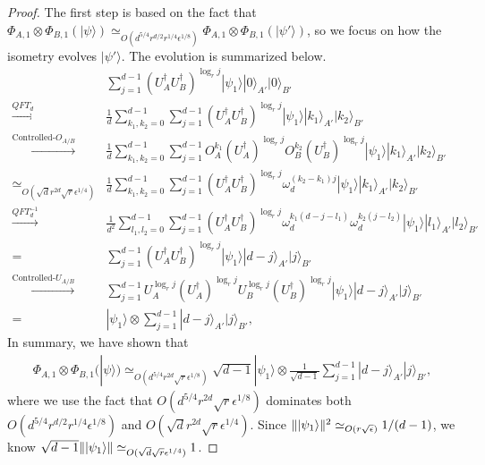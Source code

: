 \documentclass[11pt,letterpaper]{article}
\newcommand{\ket}[1]{|#1\rangle}
\newcommand{\x}{\otimes}
\newcommand{\ct}{^{\dagger}}
\DeclarePairedDelimiter{\norm}{\lVert}{\rVert}
\newcommand{\1}{\mathbb{1}}
\newcommand{\ep}{\epsilon}
\newcommand{\se}{\sqrt{\epsilon}}
\newcommand{\qe}{\epsilon^{1/4}}
\newcommand{\sd}{\sqrt{d}}
\newcommand{\sr}{\sqrt{r}}
\newcommand{\appd}[1]{\simeq_{#1}}
\theoremstyle{definition}
\begin{document}
\begin{proof}
The first step is based on the fact that $ \Phi_{A,1} \x \Phi_{B,1} (\ket{\psi}) \appd{O(d^{5/4} r^{d/2} r^{1/4} \ep^{1/8})}  \Phi_{A,1} \x \Phi_{B,1} (\ket{\psi'})$,  
so we focus on how the isometry evolves $\ket{\psi'}$.
The evolution is summarized below.
	\begin{align}
		& \sum_{j=1}^{d-1} (U_A\ct U_B\ct)^{\log_r j} \ket{\psi_1} \ket{0}_{A'}\ket{0}_{B'}\\
		\xrightarrow[]{QFT_d}& \frac{1}{d}\sum_{k_1,k_2 = 0}^{d-1} \sum_{j=1}^{d-1} (U_A\ct U_B\ct)^{\log_r j}  \ket{\psi_1}\ket{k_1}_{A'}\ket{k_2}_{B'}\\
		\xrightarrow[]{\text{Controlled-}O_{A/B}}& \frac{1}{d}\sum_{k_1,k_2 = 0}^{d-1} \sum_{j=1}^{d-1} O_A^{k_1}(U_A\ct)^{\log_r j} O_B^{k_2}(U_B\ct)^{\log_r j}
		\ket{\psi_1} \ket{k_1}_{A'}\ket{k_2}_{B'}\\
		\appd{O(\sd r^{2d} \sr \qe)}&\frac{1}{d} \sum_{k_1,k_2 = 0}^{d-1} \sum_{j=1}^{d-1} (U_A\ct U_B\ct)^{\log_r j}\omega_d^{(k_2-k_1)j}\ket{\psi_1} \ket{k_1}_{A'}\ket{k_2}_{B'}\\
		\xrightarrow[]{QFT_d^{-1}} &\frac{1}{d^2}\sum_{l_1,l_2 = 0}^{d-1}\sum_{j=1}^{d-1} (U_A\ct U_B\ct)^{\log_r j} 
		\omega_d^{k_1(d-j-l_1)}\omega_d^{k_2(j-l_2)}\ket{\psi_1} \ket{l_1}_{A'}\ket{l_2}_{B'}\\
		= &\sum_{j=1}^{d-1}(U_A\ct U_B\ct)^{\log_r j} \ket{\psi_1} \ket{d-j}_{A'}\ket{j}_{B'} \\
		\xrightarrow[]{\text{Controlled-}U_{A/B}}& \sum_{j=1}^{d-1} U_A^{\log_r j} (U_A\ct)^{\log_r j} U_B^{\log_r j} (U_B\ct)^{\log_r j} \ket{\psi_1} \ket{d-j}_{A'}\ket{j}_{B'}\\
		=&\ket{\psi_1} \x \sum_{j=1}^{d-1} \ket{d-j}_{A'}\ket{j}_{B'},
	\end{align}
In summary, we have shown that
\begin{align}
	\Phi_{A,1}\x\Phi_{B,1}(\ket{\psi}) \appd{O(d^{5/4} r^{2d} \sr \ep^{1/8})} \sqrt{d-1} \ket{\psi_1} \x \frac{1}{\sqrt{d-1}}\sum_{j=1}^{d-1} \ket{d-j}_{A'}\ket{j}_{B'},
\end{align}
where we use the fact that $O(d^{5/4} r^{2d} \sr \ep^{1/8})$ dominates both $O(d^{5/4} r^{d/2} r^{1/4} \ep^{1/8})$ and 
$O(\sd r^{2d} \sr \qe)$.
Since $\norm{\ket{\psi_1}}^2 \appd{O(r \se)} 1/(d-1)$, we know $ \sqrt{d-1} \norm{\ket{\psi_1}} \appd{O(\sd \sr\qe)} 1$.


\end{proof}
\end{document}

